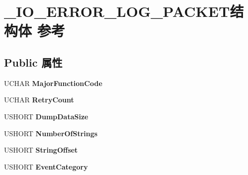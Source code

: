 \hypertarget{struct___i_o___e_r_r_o_r___l_o_g___p_a_c_k_e_t}{}\section{\+\_\+\+I\+O\+\_\+\+E\+R\+R\+O\+R\+\_\+\+L\+O\+G\+\_\+\+P\+A\+C\+K\+E\+T结构体 参考}
\label{struct___i_o___e_r_r_o_r___l_o_g___p_a_c_k_e_t}
\subsection*{Public 属性}
\begin{DoxyCompactItemize}
\item 
\mbox{\label{struct___i_o___e_r_r_o_r___l_o_g___p_a_c_k_e_t_adc6d5ac278b29ae657db57737ad14742}} 
U\+C\+H\+AR {\bfseries Major\+Function\+Code}
\item 
\mbox{\label{struct___i_o___e_r_r_o_r___l_o_g___p_a_c_k_e_t_a290674eb459a37915ced10fa273ff43d}} 
U\+C\+H\+AR {\bfseries Retry\+Count}
\item 
\mbox{\label{struct___i_o___e_r_r_o_r___l_o_g___p_a_c_k_e_t_a5064ec89a6759a7b47b445b3c8eff68e}} 
U\+S\+H\+O\+RT {\bfseries Dump\+Data\+Size}
\item 
\mbox{\label{struct___i_o___e_r_r_o_r___l_o_g___p_a_c_k_e_t_ae0318c67bfd217573dd0bf4b5da5cb9f}} 
U\+S\+H\+O\+RT {\bfseries Number\+Of\+Strings}
\item 
\mbox{\label{struct___i_o___e_r_r_o_r___l_o_g___p_a_c_k_e_t_a727f88dd929a8b146262eccc29af0e0b}} 
U\+S\+H\+O\+RT {\bfseries String\+Offset}
\item 
\mbox{\label{struct___i_o___e_r_r_o_r___l_o_g___p_a_c_k_e_t_ab073e1393a4b185ba27db1ec965b3902}} 
U\+S\+H\+O\+RT {\bfseries Event\+Category}
\item 
\mbox{\label{struct___i_o___e_r_r_o_r___l_o_g___p_a_c_k_e_t_a777b2d11d2c114796c53d02d95766189}} 

\end{DoxyCompactItemize}
